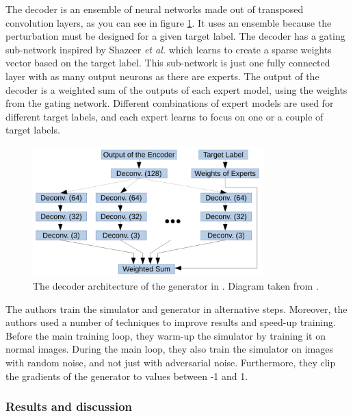 The decoder is an ensemble of neural networks made out of transposed convolution layers, as you can see in figure \ref{fig:zheng_decoder}. It uses an ensemble because the perturbation must be designed for a given target label. The decoder has a gating sub-network inspired by Shazeer \textit{et al.} \cite{experts_mixture_gate} which learns to create a sparse weights vector based on the target label. This sub-network is just one fully connected layer with as many output neurons as there are experts. The output of the decoder is a weighted sum of the outputs of each expert model, using the weights from the gating network. Different combinations of expert models are used for different target labels, and each expert learns to focus on one or a couple of target labels.

\begin{figure}[h]
    \centering
    \includegraphics[width=0.8\textwidth]{graphics/decoder.PNG}
    \caption{The decoder architecture of the generator in \cite{zheng_black_box_GAN}. Diagram taken from \cite{zheng_black_box_GAN}.}
    \label{fig:zheng_decoder}
\end{figure}

The authors train the simulator and generator in alternative steps. Moreover, the authors used a number of techniques to improve results and speed-up training. Before the main training loop, they warm-up the simulator by training it on normal images. During the main loop, they also train the simulator on images with random noise, and not just with adversarial noise. Furthermore, they clip the gradients of the generator to values between -1 and 1.

\subsubsection{Results and discussion}

